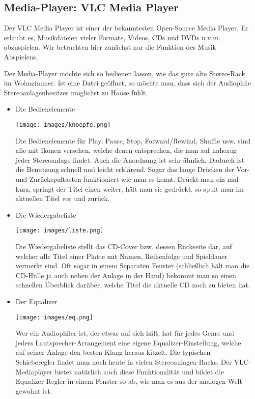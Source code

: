 \documentclass[a4paper,10pt]{article}
\begin{document}
\subsection{Media-Player: VLC Media Player}
Der VLC Media Player ist einer der bekanntesten Open-Source Media Player. Er erlaubt es, Musikdateien vieler Formate, Videos, CDs und DVDs u.v.m. abzuspielen. Wir betrachten hier zunächst nur die Funktion des Musik Abspielens.

Der Media-Player möchte sich so bedienen lassen, wie das gute alte Stereo-Rack im Wohnzimmer. Ist eine Datei geöffnet, so möchte man, dass sich der Audiophile Stereoanlagenbesitzer möglichst zu Hause fühlt.

\begin{itemize}
\item Die Bedienelemente

\texttt{[image: images/knoepfe.png]}

Die Bedienelemente für Play, Pause, Stop, Forward/Rewind, Shuffle usw. sind alle mit Ikonen versehen, welche denen entsprechen, die man auf nahezug jeder Stereoanlage findet. Auch die Anordnung ist sehr ähnlich. Dadurch ist die Benutzung schnell und leicht erklärend. Sogar das lange Drücken der Vor- und Zurückspultasten funktioniert wie man es kennt. Drückt man ein mal kurz, springt der Titel einen weiter, hält man sie gedrückt, so spult man im aktuellen Titel vor und zurück.

\item Die Wiedergabeliste

\texttt{[image: images/liste.png]}

Die Wiedergabeliste stellt das CD-Cover bzw. dessen Rückseite dar, auf welcher alle Titel einer Platte mit Namen, Reihenfolge und Spieldauer vermerkt sind. Oft sogar in einem Separaten Fenster (schließlich hält man die CD-Hülle ja auch neben der Anlage in der Hand) bekommt man so einen schnellen Überblick darüber, welche Titel die aktuelle CD noch zu bieten hat.

\item Der Equalizer

\texttt{[image: images/eq.png]}

Wer ein Audiophiler ist, der etwas auf sich hält, hat für jedes Genre und jeders Lautsprecher-Arrangement eine eigene Equalizer-Einstellung, welche auf seiner Anlage den besten Klang heraus kitzelt. Die typischen Schieberegler findet man noch heute in vielen Stereoanlagen-Racks. Der VLC-Mediaplayer bietet natürlich auch diese Funktionalität und bildet die Equalizer-Regler in einem Fenster so ab, wie man es aus der analogen Welt gewohnt ist.
\end{itemize}
\end{document}
